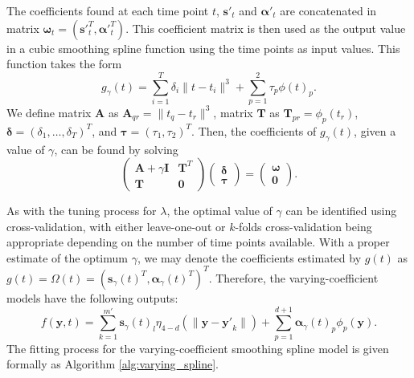 \documentclass[11pt,reqno]{article}
\theoremstyle{definition}
\begin{document}
The coefficients found at each time point $t$, $\mathbf{s'}_{t}$ and $\mathbf{\alpha'}_{t}$ are concatenated in matrix $\mathbf{\omega}_{t} = \left(\mathbf{s'}_{t}^T, \mathbf{\alpha'}_{t}^T\right)$. This coefficient matrix is then used as the output value in a cubic smoothing spline function using the time points as input values. This function takes the form
\begin{equation}
  g_{\gamma}(t) = \sum_{i=1}^{T}\delta_i\|t - t_i\|^{3} + \sum_{p=1}^{2}\tau_p \phi(t)_p. \label{eq:8}
\end{equation}
We define matrix $\mathbf{A}$ as $\mathbf{A}_{qr} = \|t_q - t_r\|^{3}$, matrix $\mathbf{T}$ as $\mathbf{T}_{pr} = \phi_p(t_r)$, $\mathbf{\delta} = \left(\delta_1, \dots, \delta_T\right)^{T}$, and $\mathbf{\tau} = \left(\tau_1, \tau_2\right)^{T}$. Then, the coefficients of $g_{\gamma}(t)$, given a value of $\gamma$, can be found by solving
\begin{equation}
  \left(
  \begin{array}{cc}
    \mathbf{A} + \gamma\mathbf{I} & \mathbf{T}^{T} \\
    \mathbf{T} & \mathbf{0}
  \end{array}
  \right)\left(
  \begin{array}{c}
    \mathbf{\delta} \\
    \mathbf{\tau}
  \end{array}
  \right) = \left(
  \begin{array}{c}
    \mathbf{\omega} \\
    \mathbf{0}
  \end{array}
  \right). \label{eq:9}
\end{equation}

As with the tuning process for $\lambda$, the optimal value of $\gamma$ can be identified using cross-validation, with either leave-one-out or $k$-folds cross-validation being appropriate depending on the number of time points available. With a proper estimate of the optimum $\gamma$, we may denote the coefficients estimated by $g(t)$ as $g(t) = \Omega(t) = \left(\mathbf{s}_{\gamma}(t)^{T}, \mathbf{\alpha}_{\gamma}(t)^{T}\right)^{T}$. Therefore, the varying-coefficient models have the following outputs:
\begin{equation}
  f(\mathbf{y}, t) = \sum_{k=1}^{m'}\mathbf{s}_{\gamma}(t)_l \eta_{4-d}\left(\|\mathbf{y} - \mathbf{y'}_k\|\right) + \sum_{p=1}^{d + 1}\mathbf{\alpha}_{\gamma}(t)_p \phi_p(\mathbf{y}). \label{eq:10}
\end{equation}
The fitting process for the varying-coefficient smoothing spline model is given formally as Algorithm \ref{alg:varying_spline}.
\end{document}
